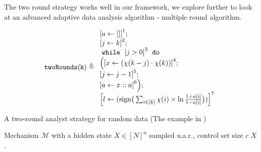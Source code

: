 The two round strategy works well in our framework, we explore further to look at an advanced adaptive data analysis algorithm - multiple round algorithm.
\begin{example}
    \[
        \kw{twoRounds(k)} \triangleq
    \begin{array}{l}
           \clabel{ a \leftarrow []}^{1} ; \\
            \clabel{\assign{j}{k} }^{2} ; \\
            \ewhile ~ \clabel{j > 0}^{3} ~ \edo ~ \\
            \Big(
             \clabel{x \leftarrow (\chi(k - j)\cdot \chi(k)) }^{4}  ; \\
             \clabel{\assign{j}{j-1}}^{5} ;\\
            \clabel{a \leftarrow x :: a}^{6}       \Big);\\
            \clabel{l \leftarrow (\mathrm{sign}\big (\sum_{i\in [k]} \chi(i)\times\ln\frac{1+a[i]}{1-a[i]} \big ))}^{7}\\
        \end{array}
    \]
    \begin{algorithm}
    \footnotesize
    \caption{A two-round analyst strategy for random data (The example in  \cite{dwork2015preserving})}
    \label{alg:twoRound}
    \begin{algorithmic}
    \REQUIRE Mechanism $\mathcal{M}$ with a hidden state $X\in [N]^{n}$ sampled u.a.r., control set size $c$
    \RETURN $X$.
    \end{algorithmic}
    \end{algorithm}
%
    \end{example}

